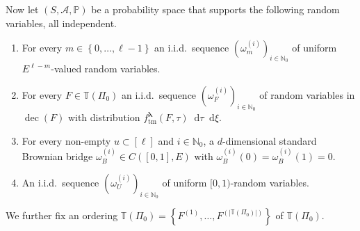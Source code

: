 \documentclass[reqno,draft]{amsart}
\numberwithin{equation}{section}
\theoremstyle{plain}
\theoremstyle{remark}
\newcommand{\N}{\mathbb{N}} %
\newcommand{\A}{\mathcal{A}} %
\renewcommand{\P}{\mathbb{P}} %
\newcommand*\diff{\mathop{}\!\mathrm{d}}
\newcommand{\fpart}{\Pi} %
\DeclareMathOperator{\dcb}{dec}
\newcommand{\ftm}{f_\mathrm{tm}^{\boldsymbol \lambda}}
\begin{document}
Now let $(S, \A, \P)$ be a probability space that supports the following random variables, all independent.
\begin{enumerate}
    \item For every $m\in \left\{ 0, \ldots ,\ell-1 \right\} $ an i.i.d.\ sequence $(\omega_m^{(i)})_{i\in \N_0}$ of uniform $E^{\ell-m}$-valued random variables.
    \item For every $F\in \mathbb{T}(\fpart_0)$ an i.i.d.\ sequence $(\omega_F^{(i)})_{i\in \N_0}$ of random variables in $\dcb(F)$ with distribution $\ftm(F,\tau)\diff \tau\diff \xi$.
    \item For every non-empty $u\subset [\ell]$ and $i\in \N_0$, a $d$-dimensional standard Brownian bridge $\omega_B^{(i)} \in C([0,1],E)$ with $\omega_B^{(i)}(0) = \omega_B^{(i)}(1) = 0$.
    \item An i.i.d.\ sequence $(\omega_U^{(i)})_{i\in \N_0}$ of uniform $[0,1)$-random variables.
\end{enumerate}
We further fix an ordering $\mathbb{T}(\fpart_0) = \left\{ F^{(1)}, \ldots ,F^{(|\mathbb{T}(\fpart_0)|)} \right\} $ of $\mathbb{T}(\fpart_0)$.
\end{document}
